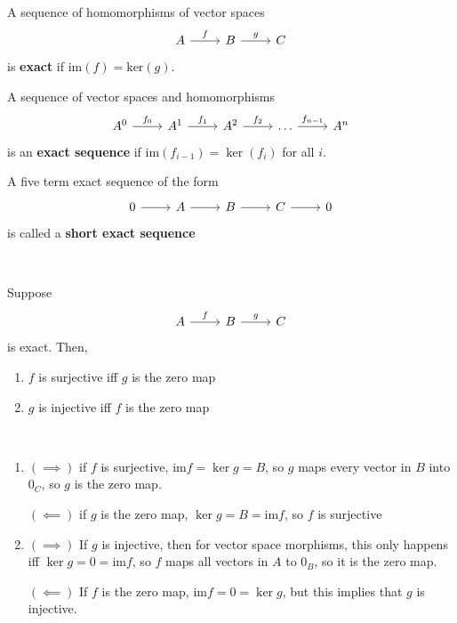 \documentclass{article}
\begin{document}
\begin{definition}
  \

  A sequence of homomorphisms of vector spaces \[
    \begin{tikzcd}
      A & B & C
      \arrow[from=1-1, to=1-2, "f"]
      \arrow[from=1-2, to=1-3, "g"]
  \end{tikzcd}\]is \textbf{exact} if $\text{im}(f) = \text{ker}(g)$.

  A sequence of vector spaces and homomorphisms \[
    \begin{tikzcd}
      A^0 & A^1 & A^2 & \dots & A^n
      \arrow[from=1-1, to=1-2, "f_0"]
      \arrow[from=1-2, to=1-3, "f_1"]
      \arrow[from=1-3, to=1-4, "f_2"]
      \arrow[from=1-4, to=1-5, "f_{n-1}"]
  \end{tikzcd}\] is an \textbf{exact sequence} if $\text{im}(f_{i-1}) = \ker(f_i)$ for all $i$.

  A five term exact sequence of the form \[
    \begin{tikzcd}
      0 & A & B & C & 0
      \arrow[from=1-1, to=1-2]
      \arrow[from=1-2, to=1-3]
      \arrow[from=1-3, to=1-4]
      \arrow[from=1-4, to=1-5]
  \end{tikzcd}\]is called a \textbf{short exact sequence}
\end{definition}

\begin{proposition}
  \

  Suppose \[
    \begin{tikzcd}
      A & B & C
      \arrow[from=1-1, to=1-2, "f"]
      \arrow[from=1-2, to=1-3, "g"]
  \end{tikzcd}\]is exact. Then,

  \begin{enumerate}
    \item $f$ is surjective iff $g$ is the zero map
    \item $g$ is injective iff $f$ is the zero map
  \end{enumerate}
\end{proposition}

\begin{customproof}
  \

  \begin{enumerate}
    \item $(\implies)$ if $f$ is surjective, $\text{im} f = \ker g = B$, so $g$ maps every vector in $B$ into $0_C$, so $g$ is the zero map.

      $(\impliedby)$ if $g$ is the zero map, $\ker g = B = \text{im} f$, so $f$ is surjective

    \item $(\implies)$ If $g$ is injective, then for vector space morphisms, this only happens iff $\ker g = 0 = \text{im} f$, so $f$ maps all vectors in $A$ to $0_B$, so it is the zero map.

      $(\impliedby)$ If $f$ is the zero map, $\text{im} f = 0 = \ker g$, but this implies that $g$ is injective.
  \end{enumerate}
\end{customproof}
\end{document}
